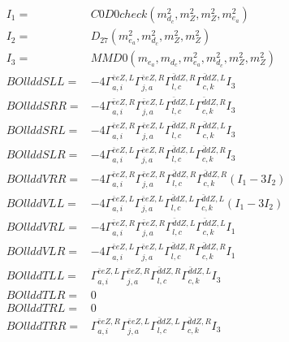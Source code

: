 \documentclass[A4,landscape]{article}
\begin{document}
\begin{align} 
I_1 = & C0D0check(m^2_{d_{{c}}}, m^2_{Z}, m^2_{Z}, m^2_{e_{{a}}}) \\ 
I_2 = & D_{27}(m^2_{e_{{a}}}, m^2_{d_{{c}}}, m^2_{Z}, m^2_{Z}) \\ 
I_3 = & MMD0(m_{e_{{a}}}, m_{d_{{c}}}, m^2_{e_{{a}}}, m^2_{d_{{c}}}, m^2_{Z}, m^2_{Z}) \\ 
  BOllddSLL= & -4  \Gamma^{\bar{e}e Z ,L}_{a, i} \Gamma^{\bar{e}e Z ,R}_{j, a} \Gamma^{\bar{d}d Z ,R}_{l, c} \Gamma^{\bar{d}d Z ,L}_{c, k} I_3 \\ 
  BOllddSRR= & -4  \Gamma^{\bar{e}e Z ,R}_{a, i} \Gamma^{\bar{e}e Z ,L}_{j, a} \Gamma^{\bar{d}d Z ,L}_{l, c} \Gamma^{\bar{d}d Z ,R}_{c, k} I_3 \\ 
  BOllddSRL= & -4  \Gamma^{\bar{e}e Z ,R}_{a, i} \Gamma^{\bar{e}e Z ,L}_{j, a} \Gamma^{\bar{d}d Z ,R}_{l, c} \Gamma^{\bar{d}d Z ,L}_{c, k} I_3 \\ 
  BOllddSLR= & -4  \Gamma^{\bar{e}e Z ,L}_{a, i} \Gamma^{\bar{e}e Z ,R}_{j, a} \Gamma^{\bar{d}d Z ,L}_{l, c} \Gamma^{\bar{d}d Z ,R}_{c, k} I_3 \\ 
  BOllddVRR= & -4  \Gamma^{\bar{e}e Z ,R}_{a, i} \Gamma^{\bar{e}e Z ,R}_{j, a} \Gamma^{\bar{d}d Z ,R}_{l, c} \Gamma^{\bar{d}d Z ,R}_{c, k} (I_1 - 3 I_2) \\ 
  BOllddVLL= & -4  \Gamma^{\bar{e}e Z ,L}_{a, i} \Gamma^{\bar{e}e Z ,L}_{j, a} \Gamma^{\bar{d}d Z ,L}_{l, c} \Gamma^{\bar{d}d Z ,L}_{c, k} (I_1 - 3 I_2) \\ 
  BOllddVRL= & -4  \Gamma^{\bar{e}e Z ,R}_{a, i} \Gamma^{\bar{e}e Z ,R}_{j, a} \Gamma^{\bar{d}d Z ,L}_{l, c} \Gamma^{\bar{d}d Z ,L}_{c, k} I_1 \\ 
  BOllddVLR= & -4  \Gamma^{\bar{e}e Z ,L}_{a, i} \Gamma^{\bar{e}e Z ,L}_{j, a} \Gamma^{\bar{d}d Z ,R}_{l, c} \Gamma^{\bar{d}d Z ,R}_{c, k} I_1 \\ 
  BOllddTLL= &  \Gamma^{\bar{e}e Z ,L}_{a, i} \Gamma^{\bar{e}e Z ,R}_{j, a} \Gamma^{\bar{d}d Z ,R}_{l, c} \Gamma^{\bar{d}d Z ,L}_{c, k} I_3 \\ 
  BOllddTLR= & 0 \\ 
  BOllddTRL= & 0 \\ 
  BOllddTRR= &  \Gamma^{\bar{e}e Z ,R}_{a, i} \Gamma^{\bar{e}e Z ,L}_{j, a} \Gamma^{\bar{d}d Z ,L}_{l, c} \Gamma^{\bar{d}d Z ,R}_{c, k} I_3 \\ 
\end{align} 
\end{document}
